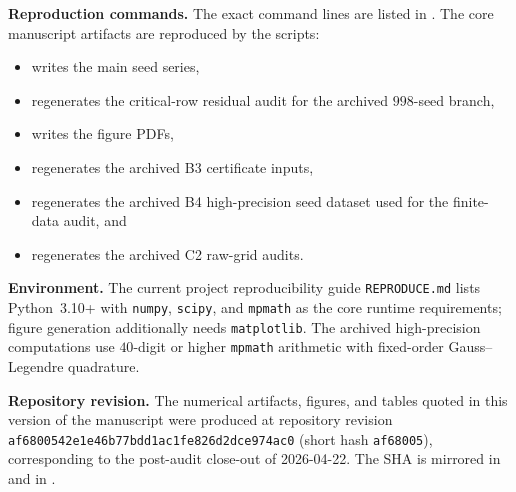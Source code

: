\documentclass[11pt,a4paper]{article}
\theoremstyle{plain}
\theoremstyle{definition}
\theoremstyle{remark}
\begin{document}
\noindent\textbf{Reproduction commands.}
The exact command lines are listed in .  The core
manuscript artifacts are reproduced by the scripts:
\begin{itemize}[nosep]
\item {} writes the main seed series,
\item {} regenerates the
  critical-row residual audit for the archived $998$-seed branch,
\item {} writes the figure PDFs,
\item {} regenerates the
  archived B3 certificate inputs,
\item {} regenerates the
  archived B4 high-precision seed dataset used for the finite-data audit, and
\item {} regenerates the archived
  C2 raw-grid audits.
\end{itemize}

\noindent\textbf{Environment.}
The current project reproducibility guide \texttt{REPRODUCE.md} lists
Python~3.10+ with \texttt{numpy}, \texttt{scipy}, and \texttt{mpmath} as the
core runtime requirements; figure generation additionally needs
\texttt{matplotlib}.  The archived high-precision computations use
$40$-digit or higher \texttt{mpmath} arithmetic with fixed-order
Gauss--Legendre quadrature.

\noindent\textbf{Repository revision.}
The numerical artifacts, figures, and tables quoted in this version of
the manuscript were produced at repository revision
\texttt{af6800542e1e46b77bdd1ac1fe826d2dce974ac0} (short hash
\texttt{af68005}), corresponding to the post-audit close-out of
2026-04-22.  The SHA is mirrored in  and in
.


\end{document}

